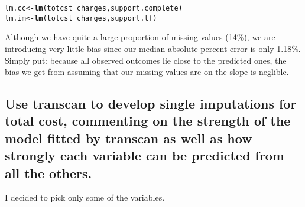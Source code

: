 \documentclass[headinclude=true, headsepline=true, DIV14]{scrartcl}\usepackage[]{graphicx}\usepackage[]{color}
\makeatletter
\newcommand{\hlopt}[1]{\textcolor[rgb]{0,0,0}{#1}}%
\newcommand{\hlstd}[1]{\textcolor[rgb]{0.345,0.345,0.345}{#1}}%
\newcommand{\hlkwb}[1]{\textcolor[rgb]{0.69,0.353,0.396}{#1}}%
\newcommand{\hlkwd}[1]{\textcolor[rgb]{0.737,0.353,0.396}{\textbf{#1}}}%
\newenvironment{kframe}{%
 \def\at@end@of@kframe{}%
 \ifinner\ifhmode%
  \def\at@end@of@kframe{\end{minipage}}%
  \begin{minipage}{\columnwidth}%
 \fi\fi%
 \def\FrameCommand##1{\hskip\@totalleftmargin \hskip-\fboxsep
 \colorbox{shadecolor}{##1}\hskip-\fboxsep
     \hskip-\linewidth \hskip-\@totalleftmargin \hskip\columnwidth}%
 \MakeFramed {\advance\hsize-\width
   \@totalleftmargin\z@ \linewidth\hsize
   \@setminipage}}%
 {\par\unskip\endMakeFramed%
 \at@end@of@kframe}
\newenvironment{knitrout}{}{} %
\makeatother
\begin{document}
\begin{knitrout}
\color{fgcolor}\begin{kframe}
\begin{alltt}
\hlstd{lm.cc} \hlkwb{<-} \hlkwd{lm}\hlstd{(totcst} \hlopt{~} \hlstd{charges, support.complete)}
\hlstd{lm.im} \hlkwb{<-} \hlkwd{lm}\hlstd{(totcst} \hlopt{~} \hlstd{charges, support.tf)}
\end{alltt}
\end{kframe}
\end{knitrout}

Although we have quite a large proportion of missing values (14\%), we are
introducing very little bias since our median absolute percent error is only 
1.18\%. Simply put: because all observed outcomes lie close to the
predicted ones, the bias we get from assuming that our missing values are on
the slope is neglible.

\subsection{Use transcan to develop single imputations for total cost, commenting on
the strength of the model fitted by transcan as well as how strongly each
variable can be predicted from all the others.}

I decided to pick only some of the variables.
\end{document}
